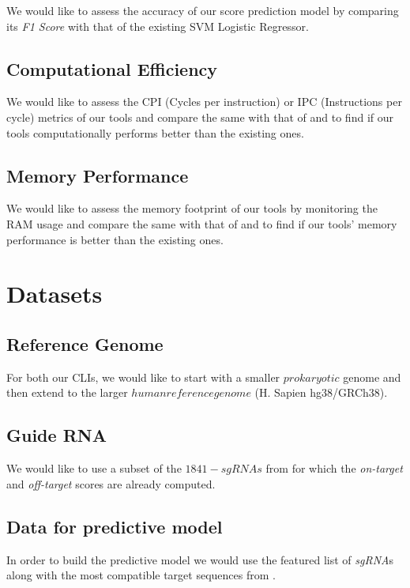 \documentclass[12pt]{article}
\begin{document}
    We would like to assess the accuracy of our score prediction model by comparing its \textit{F1 Score} with that of the existing SVM Logistic Regressor\cite{rational-design}.

    \subsection*{Computational Efficiency}
    We would like to assess the CPI (Cycles per instruction) or IPC (Instructions per cycle) metrics of our tools and compare the same with that of \cite{chopchop} and \cite{casfinder-casvalue} to find if our tools computationally performs better than the existing ones.

    \subsection*{Memory Performance}
    We would like to assess the memory footprint of our tools by monitoring the RAM usage and compare the same with that of \cite{chopchop} and \cite{casfinder-casvalue} to find if our tools' memory performance is better than the existing ones.

\section*{Datasets}
	\subsection*{Reference Genome}
    	For both our CLIs, we would like to start with a smaller $prokaryotic$ genome and then extend to the larger $human reference genome$ (H. Sapien hg38/GRCh38).

	\subsection*{Guide RNA}
    	We would like to use a subset of the $1841-sgRNAs$ from \cite{rational-design} for which the \textit{on-target} and \textit{off-target} scores are already computed.

    \subsection*{Data for predictive model}
    	In order to build the predictive model we would use the featured list of \textit{sgRNA}s along with the most compatible target sequences from \cite{rational-design}.
\end{document}
